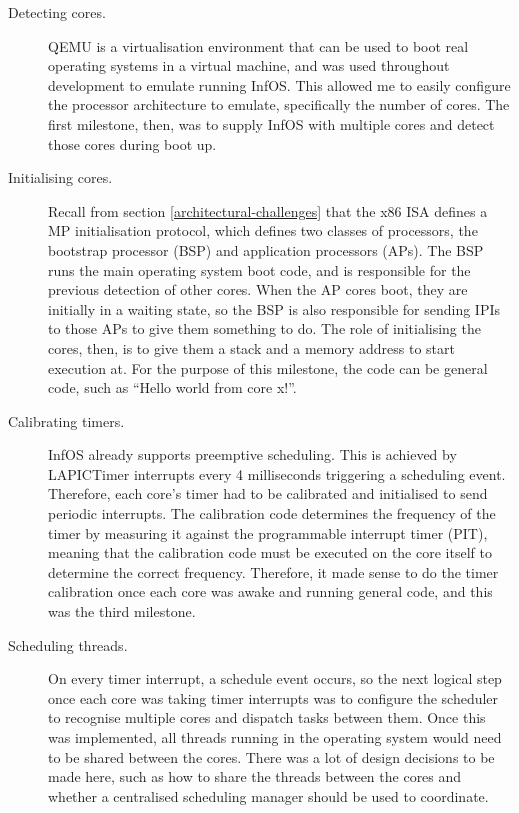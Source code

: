 \documentclass[bsc,frontabs,singlespacing,parskip,deptreport]{infthesis}
\begin{document}
\begin{description}
\item [Detecting cores.] QEMU \cite{qemu} is a virtualisation environment that can be used to boot real operating systems in a virtual machine, and was used throughout development to emulate running InfOS. This allowed me to easily configure the processor architecture to emulate, specifically the number of cores. The first milestone, then, was to supply InfOS with multiple cores and detect those cores during boot up.

\item [Initialising cores.] Recall from section \ref{architectural-challenges} that the x86 ISA defines a MP initialisation protocol, which defines two classes of processors, the bootstrap processor (BSP) and application processors (APs). The BSP runs the main operating system boot code, and is responsible for the previous detection of other cores. When the AP cores boot, they are initially in a waiting state, so the BSP is also responsible for sending IPIs to those APs to give them something to do. The role of initialising the cores, then, is to give them a stack and a memory address to start execution at. For the purpose of this milestone, the code can be general code, such as “Hello world from core x!”.

\item[Calibrating timers.] InfOS already supports preemptive scheduling. This is achieved by LAPICTimer interrupts every 4 milliseconds triggering a scheduling event. Therefore, each core’s timer had to be calibrated and initialised to send periodic interrupts. The calibration code determines the frequency of the timer by measuring it against the programmable interrupt timer (PIT), meaning that the calibration code must be executed on the core itself to determine the correct frequency. Therefore, it made sense to do the timer calibration once each core was awake and running general code, and this was the third milestone.  

\item[Scheduling threads.] On every timer interrupt, a schedule event occurs, so the next logical step once each core was taking timer interrupts was to configure the scheduler to recognise multiple cores and dispatch tasks between them. Once this was implemented, all threads running in the operating system would need to be shared between the cores. There was a lot of design decisions to be made here, such as how to share the threads between the cores and whether a centralised scheduling manager should be used to coordinate.
\end{description}
\end{document}
